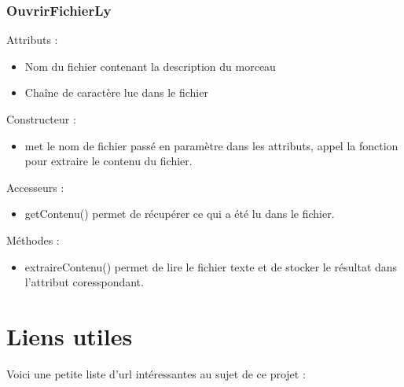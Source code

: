 \documentclass{EPUProjetPeiP}
\begin{document}
\subsection{OuvrirFichierLy}

Attributs :
\begin{itemize}
\item Nom du fichier contenant la description du morceau
\item Chaîne de caractère lue dans le fichier
\end{itemize}


Constructeur : 
\begin{itemize}
\item met le nom de fichier passé en paramètre dans les attributs, appel la fonction pour extraire le contenu du fichier.
\end{itemize}


Accesseurs :
\begin{itemize}
\item getContenu() permet de récupérer ce qui a été lu dans le fichier.
\end{itemize}

Méthodes :
\begin{itemize}
\item extraireContenu() permet de lire le fichier texte et de stocker le résultat dans l'attribut coresspondant.
\end{itemize}



\begin{thebibliography}{99}
\label{sec:biblio}
\end{thebibliography}


\appendix
{}


\chapter{Liens utiles\label{sec:liens_utiles}}
Voici une petite liste d'url intéressantes au sujet de ce projet :
\end{document}
